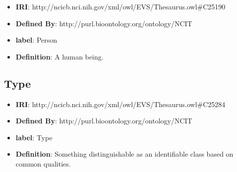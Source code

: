 \documentclass[a4paper,12pt,oneside]{article}
\begin{document}
\begin{itemize}
	\item \textbf{IRI}: http://ncicb.nci.nih.gov/xml/owl/EVS/Thesaurus.owl\#C25190
	\item \textbf{Defined By}: http://purl.bioontology.org/ontology/NCIT
	\item \textbf{label}: Person
	\item \textbf{Definition}: A human being.
\end{itemize}
  
  \subsection{Type}

\begin{itemize}
	\item \textbf{IRI}: http://ncicb.nci.nih.gov/xml/owl/EVS/Thesaurus.owl\#C25284
	\item \textbf{Defined By}: http://purl.bioontology.org/ontology/NCIT
	\item \textbf{label}: Type
	\item \textbf{Definition}: Something distinguishable as an identifiable class based on common qualities.
\end{itemize}
  \nocite{JS06}

  \newpage
  \printbibliography
  
\end{document}

